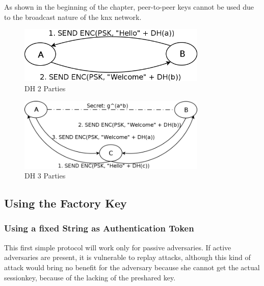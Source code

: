 As shown in the beginning of the chapter, peer-to-peer keys cannot be used due to the broadcast nature of the knx network.

\begin{figure}
    \centering
    \includegraphics[width=0.8\textwidth]{figures/dh2parties.png}
    \caption{DH 2 Parties}
    \label{fig:dhp2}
\end{figure}
\begin{figure}
    \centering
    \includegraphics[width=0.8\textwidth]{figures/dh3parties.png}
    \caption{DH 3 Parties}
    \label{fig:dhp3}
\end{figure}

\subsection{Using the Factory Key}

\subsubsection{Using a fixed String as Authentication Token}

This first simple protocol will work only for passive adversaries. If active adversaries are present, it is vulnerable to replay attacks, although
this kind of attack would bring no benefit for the adversary because she cannot get the actual sessionkey, because of the lacking of the preshared key.

